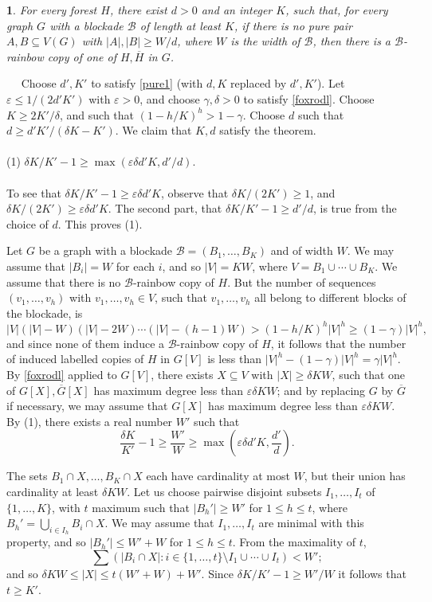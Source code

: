\documentclass[titlepage,11pt]{article}
\def\ll{,\ldots,}
\def\cupcup{\cup\cdots\cup}
\newcommand{\vare}{\varepsilon}
\newtheorem{thm}{}[section]
\newcommand{\Proof}{\noindent{\bf Proof.}\ \ }
\begin{document}
\begin{thm}\label{rainbowforest}
For every forest $H$, there exist $d>0$ and an integer $K$, such that,
for every graph $G$ with a blockade $\mathcal{B}$ of length at least $K$, if 
there is no pure pair $A,B\subseteq V(G)$ with $|A|,|B|\ge W/d$, where $W$ is the width
of $\mathcal{B}$,
then
there is a $\mathcal{B}$-rainbow copy of one of $H,\overline{H}$ in $G$.
\end{thm}
\Proof
Choose $d', K'$ to satisfy \ref{pure1} (with $d,K$ replaced by $d', K'$). Let 
$\vare\le 1/(2d'K')$ with $\vare>0$,
and choose $\gamma, \delta>0$ to satisfy \ref{foxrodl}. Choose $K\ge 2K'/\delta$, and such that
$(1-h/K)^h>1-\gamma$.
Choose $d$ such that
$d\ge d'K'/(\delta K-K')$. We claim that $K,d$ satisfy the theorem. 
\\
\\
(1) {$\delta K/K'-1\ge \max\left(\vare \delta d'K,d'/d\right)$.}
\\
\\
To see that $\delta K/K'-1 \ge \vare \delta d'K$, observe that $\delta K/(2K')\ge 1$, and 
$\delta K/(2K')\ge \vare \delta d'K$. The second part, that $\delta K/K'-1 \ge d'/d$, is true from the choice of $d$.
This proves (1).

\bigskip

Let $G$ be a graph with a blockade $\mathcal{B}=(B_1\ll B_K)$ and of width $W$. We may assume that
$|B_i|=W$ for each $i$, and so $|V|=KW$, where $V=B_1\cupcup B_K$.
We assume that there is no $\mathcal{B}$-rainbow copy of $H$. But the number of sequences $(v_1\ll v_h)$
with $v_1\ll v_h\in V$, such that $v_1\ll v_h$ all belong to different blocks of the blockade, is 
$$|V|(|V|-W)(|V|-2W)\cdots (|V|-(h-1)W)> (1-h/K)^h|V|^h\ge (1-\gamma)|V|^h,$$
and since none of them induce a $\mathcal{B}$-rainbow copy of $H$, it follows that the number of induced labelled copies of $H$
in $G[V]$ is less than $|V|^h-(1-\gamma)|V|^h=\gamma|V|^h$.
By \ref{foxrodl} applied to $G[V]$, there exists $X\subseteq V$ with $|X|\ge \delta KW$, such that
one of $G[X], \overline{G}[X]$ has maximum degree less than $\vare\delta KW$; and by replacing $G$ by $\overline{G}$ if
necessary, we may assume that $G[X]$ has maximum degree less than $\vare\delta KW$.
By (1), there exists a real number $W'$ such that
$$\frac{\delta K}{K'}-1\ge \frac{W'}{W}\ge \max\left(\vare \delta d'K,\frac{d'}{d}\right).$$

The sets $B_1\cap X\ll B_K\cap X$ each have cardinality at most $W$, but their union has cardinality at least $\delta KW$.
Let us choose pairwise disjoint subsets $I_1\ll I_t$ of $\{1\ll K\}$, with $t$ maximum such that $|B_h'|\ge W'$
for $1\le h\le t$, where $B_h'=\bigcup_{i\in I_h}B_i\cap X$.
We may assume that $I_1\ll I_{t}$ are minimal with this property, and so $|B_h'|\le W'+W$
for $1\le h\le t$. From the maximality of $t$, 
$$\sum(|B_i\cap X|:i\in \{1\ll t\}\setminus I_1\cupcup I_t)<W';$$
and so $\delta KW\le |X|\le t(W'+W)+W'$. Since $\delta K/K'-1\ge W'/W$ it follows that $t\ge K'$.
\end{document}
